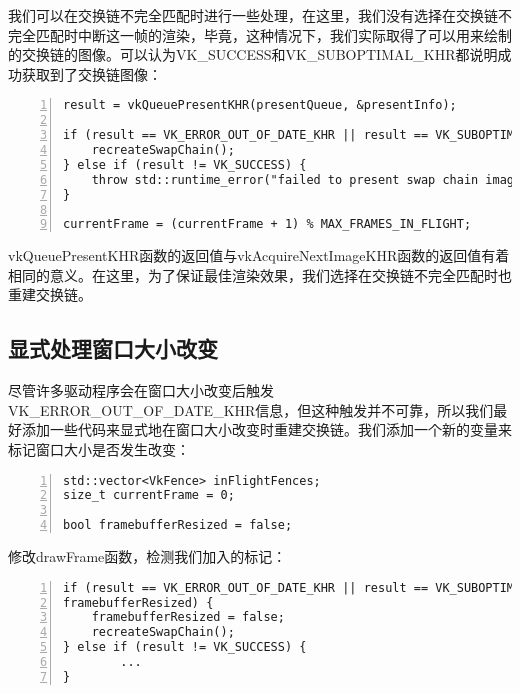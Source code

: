 \documentclass{ctexart}
\begin{document}
我们可以在交换链不完全匹配时进行一些处理，在这里，我们没有选择在交换链不完全匹配时中断这一帧的渲染，毕竟，这种情况下，我们实际取得了可以用来绘制的交换链的图像。可以认为VK\_SUCCESS和VK\_SUBOPTIMAL\_KHR都说明成功获取到了交换链图像：

\begin{lstlisting}[language={[ANSI]C},keywordstyle=\color{blue!70},commentstyle=\color{red!50!green!50!blue!50},frame=shadowbox, rulesepcolor=\color{red!20!green!20!blue!20},basicstyle=\small,numbers=left, numberstyle=\tiny,breaklines=true]
result = vkQueuePresentKHR(presentQueue, &presentInfo);

if (result == VK_ERROR_OUT_OF_DATE_KHR || result == VK_SUBOPTIMAL_KHR) {
	recreateSwapChain();
} else if (result != VK_SUCCESS) {
	throw std::runtime_error("failed to present swap chain image!");
}

currentFrame = (currentFrame + 1) % MAX_FRAMES_IN_FLIGHT;
\end{lstlisting}

vkQueuePresentKHR函数的返回值与vkAcquireNextImageKHR函数的返回值有着相同的意义。在这里，为了保证最佳渲染效果，我们选择在交换链不完全匹配时也重建交换链。

\subsection{显式处理窗口大小改变}

尽管许多驱动程序会在窗口大小改变后触发VK\_ERROR\_OUT\_OF\_DATE\_KHR信息，但这种触发并不可靠，所以我们最好添加一些代码来显式地在窗口大小改变时重建交换链。我们添加一个新的变量来标记窗口大小是否发生改变：

\begin{lstlisting}[language={[ANSI]C},keywordstyle=\color{blue!70},commentstyle=\color{red!50!green!50!blue!50},frame=shadowbox, rulesepcolor=\color{red!20!green!20!blue!20},basicstyle=\small,numbers=left, numberstyle=\tiny,breaklines=true]
std::vector<VkFence> inFlightFences;
size_t currentFrame = 0;

bool framebufferResized = false;
\end{lstlisting}

修改drawFrame函数，检测我们加入的标记：

\begin{lstlisting}[language={[ANSI]C},keywordstyle=\color{blue!70},commentstyle=\color{red!50!green!50!blue!50},frame=shadowbox, rulesepcolor=\color{red!20!green!20!blue!20},basicstyle=\small,numbers=left, numberstyle=\tiny,breaklines=true]
if (result == VK_ERROR_OUT_OF_DATE_KHR || result == VK_SUBOPTIMAL_KHR || 
framebufferResized) {
	framebufferResized = false;
	recreateSwapChain();
} else if (result != VK_SUCCESS) {
		...
}
\end{lstlisting}
\end{document}
